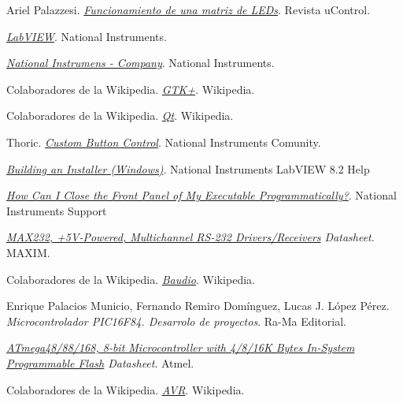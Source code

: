 \begin{thebibliography}{15}

  Ariel Palazzesi.
  \emph{\href{http://www.ucontrol.com.ar/wiki/index.php?title=Funcionamiento_de_una_matriz_de_LEDs}{Funcionamiento de una matriz de LEDs}}.
  Revista uControl.

  \emph{\href{http://www.ni.com/labview/}{LabVIEW}}.
  National Instruments.

  \emph{\href{http://www.ni.com/company/}{National Instrumens - Company}}.
  National Instruments.

  Colaboradores de la Wikipedia.
  \emph{\href{http://es.wikipedia.org/wiki/Gtk}{GTK+}}.
  Wikipedia.

  Colaboradores de la Wikipedia.
  \emph{\href{http://es.wikipedia.org/wiki/Qt\_\%28biblioteca\%29}{Qt}}.
  Wikipedia.

  Thoric.
  \emph{\href{http://decibel.ni.com/content/docs/DOC-4871}{Custom Button Control}}.
  National Instruments Comunity.
  
  \emph{\href{http://zone.ni.com/reference/en-XX/help/371361B-01/lvhowto/build_installer/}{Building an Installer (Windows)}}.
  National Instruments LabVIEW 8.2 Help
  
  \emph{\href{http://digital.ni.com/public.nsf/allkb/4BE0544020D101AA8625687400638594}{How Can I Close the Front Panel of My Executable Programmatically?}}.
  National Instruments Support

  \emph{\href{http://datasheets.maxim-ic.com/en/ds/MAX220-MAX249.pdf}{MAX232, +5V-Powered, Multichannel RS-232 Drivers/Receivers} Datasheet}.
  MAXIM. 

  Colaboradores de la Wikipedia.
  \emph{\href{http://es.wikipedia.org/wiki/Baudio}{Baudio}}.
  Wikipedia.

  Enrique Palacios Municio, Fernando Remiro Domínguez, Lucas J. López Pérez.
  \emph{Microcontrolador PIC16F84. Desarrolo de proyectos}.
  Ra-Ma Editorial.

  \emph{\href{http://www.atmel.com/dyn/resources/prod_documents/doc2545.pdf}{ATmega48/88/168, 8-bit Microcontroller with 4/8/16K Bytes In-System Programmable Flash} Datasheet}.
  Atmel.

  Colaboradores de la Wikipedia.
  \emph{\href{http://es.wikipedia.org/wiki/Avr}{AVR}}.
  Wikipedia.


\end{thebibliography}
